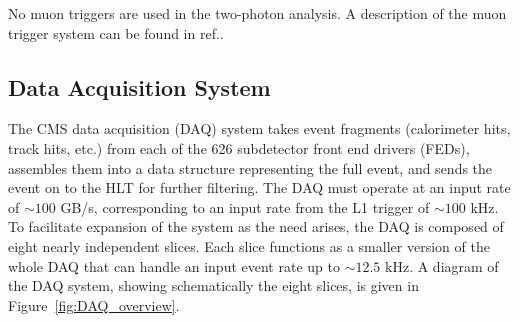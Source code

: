 \documentclass[dissertation.tex]{subfiles}
\begin{document}
No muon triggers are used in the two-photon analysis.  A description of the muon trigger system can be found in ref.\cite{1748-0221-3-08-S08004}.

\subsection{Data Acquisition System}
\label{sec:Data Acquisition System}

The CMS data acquisition (DAQ) system takes event fragments (calorimeter hits, track hits, etc.) from each of the 626 subdetector front end drivers (FEDs), assembles them into a data structure representing the full event, and sends the event on to the HLT for further filtering.  The DAQ must operate at an input rate of $\sim100$ GB/s, corresponding to an input rate from the L1 trigger of $\sim100$ kHz.  To facilitate expansion of the system as the need arises, the DAQ is composed of eight nearly independent slices.  Each slice functions as a smaller version of the whole DAQ that can handle an input event rate up to $\sim12.5$ kHz.  A diagram of the DAQ system, showing schematically the eight slices, is given in Figure~\ref{fig:DAQ_overview}.
\end{document}
